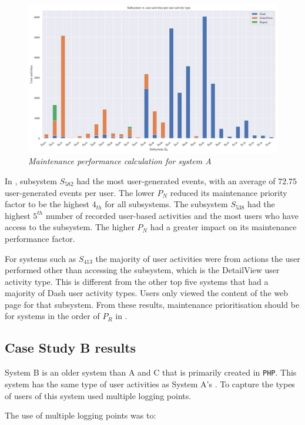 \begin{figure}[!htb]
	\centering %
	\includegraphics[width=0.95\linewidth]{img/ch3/analysis/case_A_subsystems_1.pdf}
	\caption[Maintenance performance calculation for system A]
	{\textit{Maintenance performance calculation for system A}}\label{fig:ch3_caseAAnalysis}
\end{figure}

\par In , subsystem $S_{582}$ had the most user-generated events, with an average of $72.75$ user-generated events per user. The lower $P_N$ reduced its maintenance priority factor to be the highest $4_{th}$ for all subsystems. The subsystem $S_{538}$ had the highest $5^{th}$ number of recorded user-based activities and the most users who have access to the subsystem. The higher $P_N$ had a greater impact on its maintenance performance factor.\par For systems such as $S_{413}$ the majority of user activities were from actions the user performed other than accessing the subsystem, which is the DetailView user activity type. This is different from the other top five systems that had a majority of Dash user activity types. Users only viewed the content of the web page for that subsystem. From these results, maintenance prioritisation should be for systems in the order of $P_R$ in . 

\subsection{Case Study B results}\label{sec:ch3_csB}
System B is an older system than A and C that is primarily created in \texttt{PHP}. This system has the same type of user activities as System A's . To capture the types of users of  this system used multiple logging points.\par The use of multiple logging points was to:

